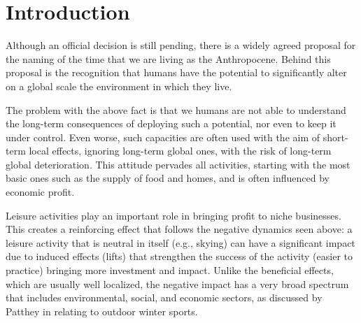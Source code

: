 \documentclass[sustainability,article,submit,pdftex,moreauthors]{Definitions/mdpi}
\begin{document}






\section{Introduction}

Although an official decision is still pending, there is a widely agreed proposal for the naming of the time that we are living as the Anthropocene.  Behind this proposal is the recognition that humans have the potential to significantly alter on a global scale the environment in which they live.

The problem with the above fact is that we humans are not able to understand the long-term consequences of deploying such a potential, nor even to keep it under control. Even worse, such capacities are often used with the aim of short-term local effects, ignoring long-term global ones, with the risk of long-term global deterioration. This attitude pervades all activities, starting with the most basic ones such as the supply of food and homes, and is often influenced by economic profit.

Leisure activities play an important role in bringing profit to niche businesses. This creates a reinforcing effect that follows the negative dynamics seen above: a leisure activity that is neutral in itself (e.g., skying) can have a significant impact due to induced effects (lifts) that strengthen the success of the activity (easier to practice) bringing more investment and impact. Unlike the beneficial effects, which are usually well localized, the negative impact has a very broad spectrum that includes environmental, social, and economic sectors, as discussed by Patthey in \cite{pat08a} relating to outdoor winter sports.
\end{document}
